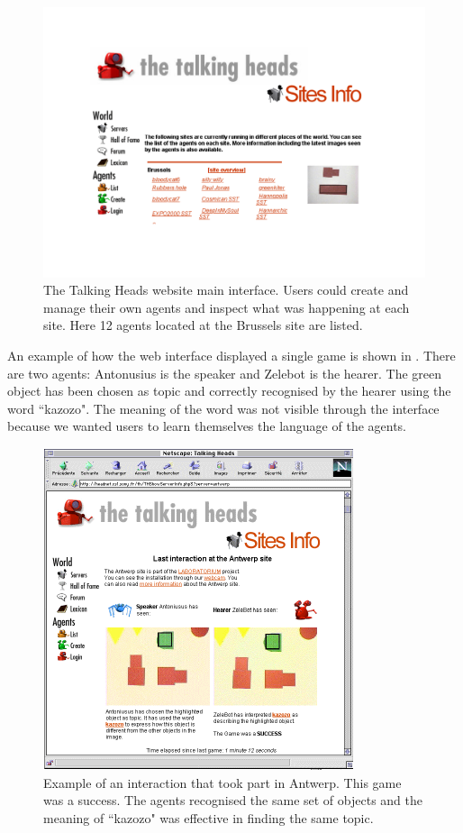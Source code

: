 \begin{figure}[htbp]
  \centerline{\includegraphics[width=.85\textwidth]{chap8/figures/th-website}}
\caption{\label{fig:thwebsite} 
The Talking Heads website main interface. Users could create and manage their own agents and inspect what was happening 
at each site. Here 12 agents located at the Brussels site are listed.}
\end{figure}

An example of how the web interface displayed a single game is shown in . 
There are two agents: Antonusius is the speaker and Zelebot is the hearer. 
The green object has been chosen as topic and correctly 
recognised by the hearer using the word ``kazozo". The meaning of the word was not visible through the interface because we 
wanted users to learn themselves the language of the agents. 


\begin{figure}[htbp]
  \centerline{\includegraphics[width=.85\textwidth]{chap8/figures/zelebot}}
\caption{\label{fig:thwebsite-agent} 
Example of an interaction that took part in Antwerp. This game was a success. The agents recognised the same
set of objects and the meaning of ``kazozo" was effective in finding the same topic. 
}
\end{figure}

